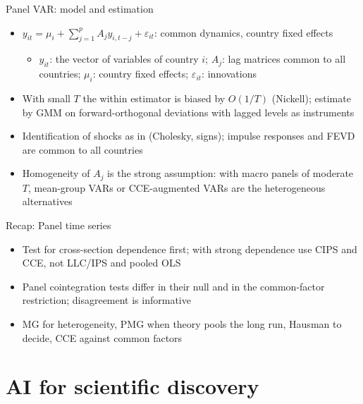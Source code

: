 \begin{frame}{Panel VAR: model and estimation}
\itemsize{\small}
\begin{itemize}
    \item $y_{it} = \mu_i + \sum_{j=1}^pA_jy_{i,t-j} + \varepsilon_{it}$: common dynamics, country fixed effects 
    \begin{itemize}
        \item $y_{it}$: the vector of variables of country $i$; $A_j$: lag matrices common to all countries; $\mu_i$: country fixed effects; $\varepsilon_{it}$: innovations
    \end{itemize}
    \item With small $T$ the within estimator is biased by $O(1/T)$ (Nickell); estimate by GMM on forward-orthogonal deviations with lagged levels as instruments 
    \item Identification of shocks as in  (Cholesky, signs); impulse responses and FEVD are common to all countries
    \item Homogeneity of $A_j$ is the strong assumption: with macro panels of moderate $T$, mean-group VARs or CCE-augmented VARs are the heterogeneous alternatives
\end{itemize}
\end{frame}

\begin{frame}{Recap: Panel time series}
\itemsize{\small}
\begin{itemize}
    \item Test for cross-section dependence first; with strong dependence use CIPS and CCE, not LLC/IPS and pooled OLS
    \item Panel cointegration tests differ in their null and in the common-factor restriction; disagreement is informative
    \item MG for heterogeneity, PMG when theory pools the long run, Hausman to decide, CCE against common factors
\end{itemize}
\end{frame}


\section{AI for scientific discovery}

